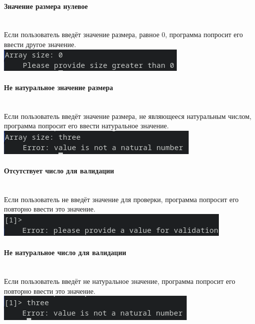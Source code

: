 \documentclass[a4paper, 12pt]{article}
\begin{document}
\paragraph{Значение размера нулевое}\mbox{}\\
Если пользователь введёт значение размера, равное 0,
программа попросит его ввести другое значение.\\
\includegraphics{zero_size.png}


\paragraph{Не натуральное значение размера}\mbox{}\\
Если пользователь введёт значение размера, не являющееся натуральным числом,
программа попросит его ввести натуральное значение.\\
\includegraphics{non_natural_size.png}


\paragraph{Отсутствует число для валидации}\mbox{}\\
Если пользователь не введёт значение для проверки,
программа попросит его повторно ввести это значение.\\
\includegraphics{no_input_validate.png}


\paragraph{Не натуральное число для валидации}\mbox{}\\
Если пользователь введёт не натуральное значение,
программа попросит его повторно ввести это значение.\\
\includegraphics{non_natural_input_validate.png}
\end{document}
